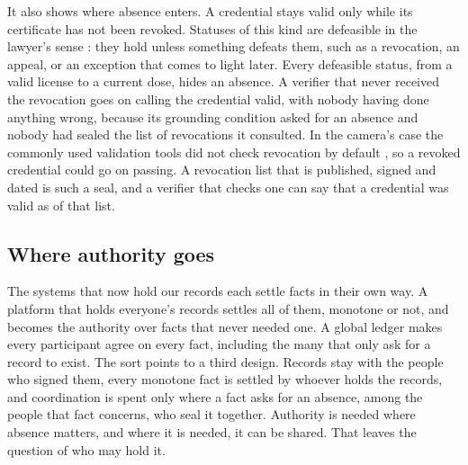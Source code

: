 It also shows where absence enters. A credential stays valid only while its certificate has not been
revoked. Statuses of this kind are defeasible in the lawyer's sense \citep{hart1949}: they hold
unless something defeats them, such as a revocation, an appeal, or an exception that comes to light
later. Every defeasible status, from a valid license to a current dose, hides an absence. A verifier
that never received the revocation goes on calling the credential valid, with nobody having done
anything wrong, because its grounding condition asked for an absence and nobody had sealed the list
of revocations it consulted. In the camera's case the commonly used validation tools did not check
revocation by default \citep{petapixel2025c}, so a revoked credential could go on passing. A
revocation list that is published, signed and dated is such a seal, and a verifier that checks one
can say that a credential was valid as of that list.

\subsection{Where authority goes}\label{sec:where}

The systems that now hold our records each settle facts in their own way. A platform that holds
everyone's records settles all of them, monotone or not, and becomes the authority over facts that
never needed one. A global ledger makes every participant agree on every fact, including the many
that only ask for a record to exist. The sort points to a third design. Records stay with the people
who signed them, every monotone fact is settled by whoever holds the records, and coordination is
spent only where a fact asks for an absence, among the people that fact concerns, who seal it
together. Authority is needed where absence matters, and where it is needed, it can be shared. That
leaves the question of who may hold it.
